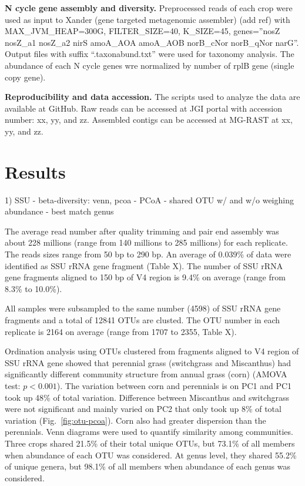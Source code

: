 \documentclass[12pt]{article}
\begin{document}
{\bf N cycle gene assembly and diversity.}
Preprocessed reads of each crop were used as input to Xander (gene targeted metagenomic assembler) (add ref) with MAX\_JVM\_HEAP=300G, FILTER\_SIZE=40, K\_SIZE=45, genes=''nosZ nosZ\_a1 nosZ\_a2 nirS amoA\_AOA amoA\_AOB norB\_cNor norB\_qNor narG''. Output files with suffix ``.taxonabund.txt'' were used for taxonomy analysis. The abundance of each N cycle genes wre normalized by number of rplB gene (single copy gene).

{\bf Reproducibility and data accession.}
The scripts used to analyze the data are available at GitHub. Raw reads can be accessed at JGI portal with accession number: xx, yy, and zz. Assembled contigs can be accessed at MG-RAST at xx, yy, and zz.

\section{Results}

1) SSU
- beta-diversity: venn, pcoa
  - PCoA
  - shared OTU w/ and w/o weighing abundance
  - best match genus

The average read number after quality trimming and pair end assembly was about 228 millions (range from 140 millions to 285 millions) for each replicate. The reads sizes range from 50 bp to 290 bp. An average of 0.039\% of data were identified as SSU rRNA gene fragment (Table X). The number of SSU rRNA gene fragments aligned to 150 bp of V4 region is 9.4\% on average (range from 8.3\% to 10.0\%).

All samples were subsampled to the same number (4598) of SSU rRNA gene fragments and a total of 12841 OTUs are clusted. The OTU number in each replicate is 2164 on average (range from 1707 to 2355, Table X).

Ordination analysis using OTUs clustered from fragments aligned to V4 region of SSU rRNA gene showed that perennial grass (switchgrass and Miscanthus) had significantly different community structure from annual grass (corn) (AMOVA test: $p < 0.001$). The variation between corn and perennials is on PC1 and PC1 took up 48\% of total variation. Difference between Miscanthus and switchgrass were not significant and mainly varied on PC2 that only took up 8\% of total variation (Fig.~\ref{fig:otu-pcoa}). Corn also had greater dispersion than the perennials. Venn diagrams were used to quantify similarity among communities. Three crops shared 21.5\% of their total unique OTUs, but 73.1\% of all members when abundance of each OTU was considered. At genus level, they shared 55.2\% of unique genera, but 98.1\% of all members when abundance of each genus was considered.
\end{document}

